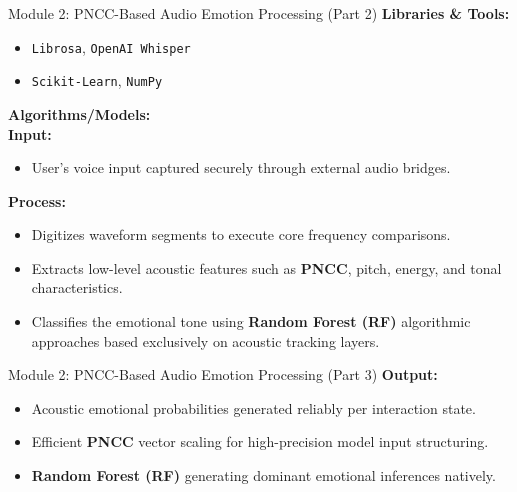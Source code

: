 \documentclass[11pt]{beamer}
\begin{document}
\begin{frame}{Module 2: PNCC-Based Audio Emotion Processing (Part 2)}
\textbf{Libraries \& Tools:}
\begin{itemize}
    \item \texttt{Librosa}, \texttt{OpenAI Whisper}
    \item \texttt{Scikit-Learn}, \texttt{NumPy}
\end{itemize}

\vspace{0.3cm}
\textbf{Algorithms/Models:}
\\
\textbf{Input:}
\begin{itemize}
    \item User’s voice input captured securely through external audio bridges.
\end{itemize}

\textbf{Process:}
\begin{itemize}
    \item Digitizes waveform segments to execute core frequency comparisons.
    \item Extracts low-level acoustic features such as \textbf{PNCC}, pitch, energy, and tonal characteristics.
    \item Classifies the emotional tone using \textbf{Random Forest (RF)} algorithmic approaches based exclusively on acoustic tracking layers.
\end{itemize}
\end{frame}
\begin{frame}{Module 2: PNCC-Based Audio Emotion Processing (Part 3)}
\textbf{Output:}
\begin{itemize}
    \item Acoustic emotional probabilities generated reliably per interaction state.
\end{itemize}
\begin{itemize}
    \item Efficient \textbf{PNCC} vector scaling for high-precision model input structuring.
    \item \textbf{Random Forest (RF)} generating dominant emotional inferences natively.
\end{itemize}
\end{frame}
\end{document}
